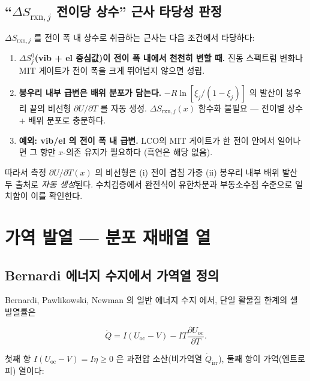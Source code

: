 \documentclass[11pt,a4paper]{article}
\newcommand{\rxn}{\mathrm{rxn}}
\newcommand{\irr}{\mathrm{irr}}
\newcommand{\oc}{\mathrm{oc}}
\begin{document}
\subsection{``$\Delta S_{\rxn,j}$ 전이당 상수'' 근사 타당성 판정}

$\Delta S_{\rxn,j}$ 를 전이 폭 내 상수로 취급하는 근사는 다음 조건에서 타당하다:
\begin{enumerate}[label=(\alph*),leftmargin=1.6em,itemsep=2pt]
\item \textbf{$\Delta S^0_j$(vib + el 중심값)이 전이 폭 내에서 천천히 변할 때.}
  진동 스펙트럼 변화나 MIT 게이트가 전이 폭을 크게 뛰어넘지 않으면 성립.
\item \textbf{봉우리 내부 급변은 배위 분포가 담는다.}
  $-R\ln[\xi_j/(1-\xi_j)]$ 의 발산이 봉우리 끝의 비선형 $\partial U/\partial T$ 를 자동 생성.
  $\Delta S_{\rxn,j}(x)$ 함수화 불필요 — 전이별 상수 + 배위 분포로 충분하다.
\item \textbf{예외: vib/el 의 전이 폭 내 급변.}
  LCO의 MIT 게이트가 한 전이 안에서 일어나면 그 항만 $x$-의존 유지가 필요하다
  (흑연은 해당 없음).
\end{enumerate}

따라서 측정 $\partial U/\partial T(x)$ 의 비선형은 (i) 전이 겹침 가중 (ii) 봉우리 내부 배위 발산
두 출처로 \emph{자동 생성}된다. 수치검증에서 완전식이 유한차분과 부동소수점 수준으로 일치함이
이를 확인한다.

\section{가역 발열 — 분포 재배열 열}\label{sec:qrev}

\subsection{Bernardi 에너지 수지에서 가역열 정의}

Bernardi, Pawlikowski, Newman 의 일반 에너지 수지 \cite{bernardi1985} 에서,
단일 활물질 한계의 셀 발열률은

\begin{equation}
  \dot Q = I(U_\oc - V) - IT\frac{\partial U_\oc}{\partial T}.
  \label{eq:bernardi}
\end{equation}

첫째 항 $I(U_\oc - V) = I\eta \ge 0$ 은 과전압 소산(비가역열 $\dot Q_\irr$),
둘째 항이 가역(엔트로피) 열이다:
\end{document}

